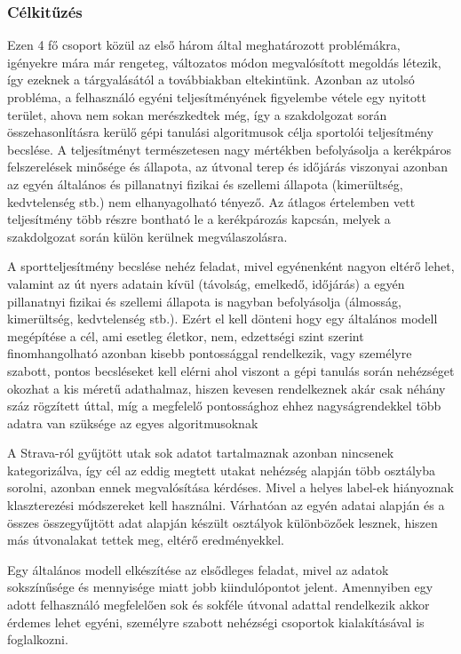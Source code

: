 \subsubsection{Célkitűzés}
Ezen 4 fő csoport közül az első három által meghatározott problémákra, igényekre mára már rengeteg, változatos módon megvalósított megoldás létezik, így ezeknek a tárgyalásától a továbbiakban eltekintünk. Azonban az utolsó probléma, a felhasználó egyéni teljesítményének figyelembe vétele egy nyitott terület, ahova nem sokan merészkedtek még, így a szakdolgozat során összehasonlításra kerülő gépi tanulási algoritmusok célja sportolói teljesítmény becslése. A teljesítményt természetesen nagy mértékben befolyásolja a kerékpáros felszerelések minősége és állapota, az útvonal terep és időjárás viszonyai azonban az egyén általános és pillanatnyi fizikai és szellemi állapota (kimerültség, kedvtelenség stb.) nem elhanyagolható tényező. Az átlagos értelemben vett teljesítmény több részre bontható le a kerékpározás kapcsán, melyek a szakdolgozat során külön kerülnek megválaszolásra.



A sportteljesítmény becslése nehéz feladat, mivel egyénenként nagyon eltérő lehet, valamint az út nyers adatain kívül (távolság, emelkedő, időjárás) a egyén pillanatnyi fizikai és szellemi állapota is nagyban befolyásolja (álmosság, kimerültség, kedvtelenség stb.). Ezért el kell dönteni hogy egy általános modell megépítése a cél, ami esetleg életkor, nem, edzettségi szint szerint finomhangolható azonban kisebb pontossággal rendelkezik, vagy személyre szabott, pontos becsléseket kell elérni ahol viszont a gépi tanulás során nehézséget okozhat a kis méretű adathalmaz, hiszen kevesen rendelkeznek akár csak néhány száz rögzített úttal, míg a megfelelő pontossághoz ehhez nagyságrendekkel több adatra van szüksége az egyes algoritmusoknak




A Strava-ról gyűjtött utak sok adatot tartalmaznak azonban nincsenek kategorizálva, így cél az eddig megtett utakat nehézség alapján több osztályba sorolni, azonban ennek megvalósítása kérdéses. Mivel a helyes label-ek hiányoznak klaszterezési módszereket kell használni. Várhatóan az egyén adatai alapján és a összes összegyűjtött adat alapján készült osztályok különbözőek lesznek, hiszen más útvonalakat tettek meg, eltérő eredményekkel.

Egy általános modell elkészítése az elsődleges feladat, mivel az adatok sokszínűsége és mennyisége miatt jobb kiindulópontot jelent. Amennyiben egy adott felhasználó megfelelően sok és sokféle útvonal adattal rendelkezik akkor érdemes lehet egyéni, személyre szabott nehézségi csoportok kialakításával is foglalkozni.

